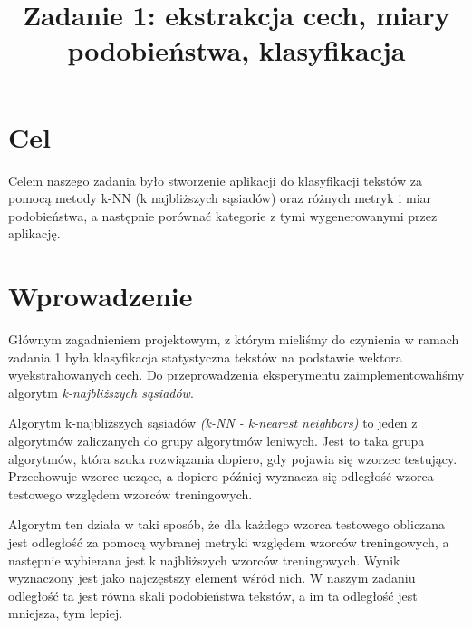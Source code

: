 \documentclass{classrep}
\author{
  \studentinfo{Radosław Grela}{216769} \and
  \studentinfo{Jakub Wąchała}{216914} 
}
\title{Zadanie 1: ekstrakcja cech, miary podobieństwa, klasyfikacja}
\begin{document}
\maketitle

\section{Cel} %
Celem naszego zadania było stworzenie aplikacji do klasyfikacji tekstów za pomocą metody k-NN (k najbliższych sąsiadów) oraz
różnych metryk i miar podobieństwa, a następnie porównać kategorie z tymi wygenerowanymi przez aplikację.

\section{Wprowadzenie} %
Głównym zagadnieniem projektowym, z którym mieliśmy do czynienia w ramach zadania 1 była klasyfikacja statystyczna tekstów na podstawie wektora wyekstrahowanych cech. Do przeprowadzenia eksperymentu zaimplementowaliśmy algorytm \textsl{k-najbliższych sąsiadów}.

Algorytm k-najbliższych sąsiadów \textsl{(k-NN - k-nearest neighbors)} to jeden z algorytmów zaliczanych do grupy algorytmów leniwych. Jest to taka grupa algorytmów, która szuka rozwiązania dopiero, gdy pojawia się wzorzec testujący. Przechowuje wzorce uczące, a dopiero później wyznacza się odległość wzorca testowego względem wzorców treningowych. \cite{leniwy} 

Algorytm ten działa w taki sposób, że dla każdego wzorca testowego obliczana jest odległość za pomocą wybranej metryki względem wzorców treningowych, a następnie wybierana jest k najbliższych wzorców treningowych. Wynik wyznaczony jest jako najczęstszy element wśród nich. W naszym zadaniu odległość ta jest równa skali podobieństwa tekstów, a im ta odległość jest mniejsza, tym lepiej.
\end{document}
